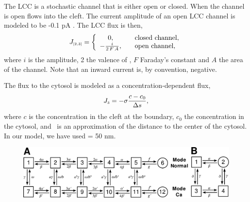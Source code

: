 The LCC is a stochastic channel that is either open or closed. When
the channel is open \Ca flows into the cleft. The current amplitude
of an open LCC channel is modeled to be -0.1 pA
\citep{GuiaSternLakattaEtAl2001}. The LCC flux is then,
\begin{equation}
\label{eq:hake:constant-current-flux}
J_{\scriptscriptstyle[2,3]}= \left\{
  \begin{array}{c@{\quad\quad}l}
    0,& \text{closed channel},\\
    - \frac{i}{2\,F\,A},& \text{open channel},
  \end{array}
\right.
\end{equation}
where $i$ is the amplitude, 2 the valence of \Ca, $F$
Faraday's constant and $A$ the area of the channel. Note that an
inward current is, by convention, negative.

The flux to the cytosol is modeled as a concentration-dependent flux,
\begin{equation}
  \label{eq:hake:conc-dependent-flux}
  J_{\scriptscriptstyle 3}= -\sigma\frac{c - c_0}{\Delta{}s},
\end{equation}
where $c$ is the concentration in the cleft at the boundary, $c_0$ the
concentration in the cytosol, and \Ds~is an approximation of the
distance to the center of the cytosol. In our model, we have used \Ds
= 50 nm.

\begin{figure}
{\includegraphics[height=\fullfig]{chapters/hake/pdf/markov_models}}
  \vspace*{30pt}
\end{figure}

